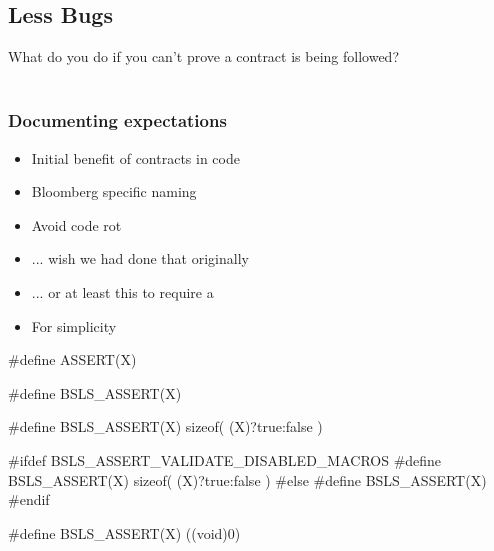 \subsection{Less Bugs}
\begin{frame}
  What do you do if you can't prove a contract is being followed? \\
  \\ \pause
\end{frame}
  

\begin{frame}
  \tableofcontents[currentsection,currentsubsection,subsectionstyle=show/shaded/hide]
\end{frame}

\begin{frame}[fragile]
  
  \frametitle{Documenting expectations}

  \begin{itemize}
  \item<1-> Initial benefit of contracts in code 
  \item<3-> Bloomberg specific naming
  \item<4-> Avoid code rot
  \item<5-> ... wish we had done that originally
  \item<6-> ... or at least this to require a \cc{;}
  \item<7-> For simplicity
  \end{itemize}
\begin{overprint}
\begin{cppcodebox}
#define ASSERT(X)
\end{cppcodebox}

\begin{cppcodebox}
#define BSLS_ASSERT(X)
\end{cppcodebox}

\begin{cppcodebox}
#define BSLS_ASSERT(X) sizeof( (X)?true:false )    
\end{cppcodebox}

\begin{cppcodebox}
#ifdef BSLS_ASSERT_VALIDATE_DISABLED_MACROS
#define BSLS_ASSERT(X) sizeof( (X)?true:false )
#else
#define BSLS_ASSERT(X)
#endif
\end{cppcodebox}

\begin{cppcodebox}
#define BSLS_ASSERT(X) ((void)0)
\end{cppcodebox}

\end{overprint}

\end{frame}

